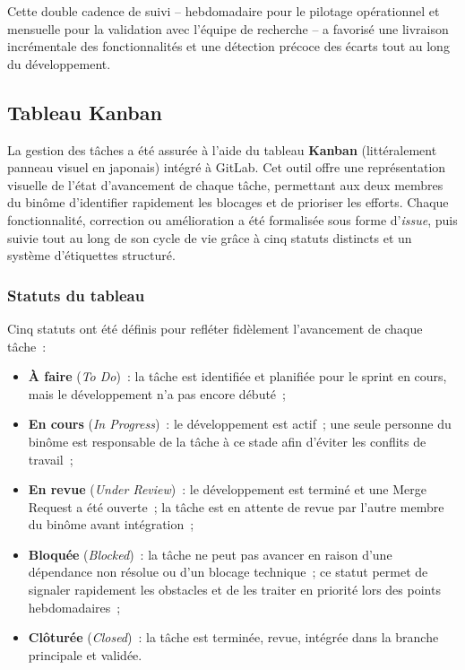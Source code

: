 Cette double cadence de suivi -- hebdomadaire pour le pilotage opérationnel et mensuelle pour la
validation avec l'équipe de recherche -- a favorisé une livraison incrémentale des fonctionnalités
et une détection précoce des écarts tout au long du développement.

\subsection{Tableau Kanban}

La gestion des tâches a été assurée à l'aide du tableau \textbf{Kanban} (littéralement
\og{}panneau visuel\fg{} en japonais) intégré à GitLab. Cet outil offre une représentation
visuelle de l'état d'avancement de chaque tâche, permettant aux deux membres du binôme
d'identifier rapidement les blocages et de prioriser les efforts. Chaque fonctionnalité,
correction ou amélioration a été formalisée sous forme d'\textit{issue}, puis suivie tout au
long de son cycle de vie grâce à cinq statuts distincts et un système d'étiquettes structuré.

\subsubsection*{Statuts du tableau}

Cinq statuts ont été définis pour refléter fidèlement l'avancement de chaque tâche~:

\begin{itemize}
    \item \textbf{À faire} (\textit{To Do})~: la tâche est identifiée et planifiée pour le sprint
          en cours, mais le développement n'a pas encore débuté~;
    \item \textbf{En cours} (\textit{In Progress})~: le développement est actif~; une seule
          personne du binôme est responsable de la tâche à ce stade afin d'éviter les conflits
          de travail~;
    \item \textbf{En revue} (\textit{Under Review})~: le développement est terminé et une Merge
          Request a été ouverte~; la tâche est en attente de revue par l'autre membre du binôme
          avant intégration~;
    \item \textbf{Bloquée} (\textit{Blocked})~: la tâche ne peut pas avancer en raison d'une
          dépendance non résolue ou d'un blocage technique~; ce statut permet de signaler
          rapidement les obstacles et de les traiter en priorité lors des points hebdomadaires~;
    \item \textbf{Clôturée} (\textit{Closed})~: la tâche est terminée, revue, intégrée dans la
          branche principale et validée.
\end{itemize}

